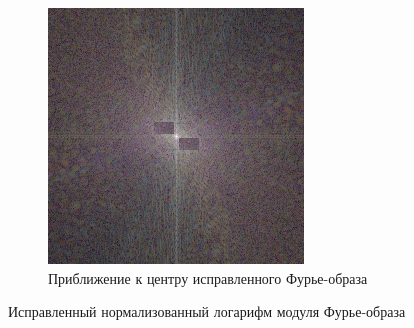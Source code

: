 \documentclass[a4paper, 12pt]{article}
\begin{document}
\begin{figure}[H]
\begin{subfigure}{0.45\textwidth}
            \includegraphics[width=\linewidth]{corr_fft2_close.png}
            \caption{Приближение к центру исправленного Фурье-образа}
            \label{fig:c4fft2cl}
        \end{subfigure}
        \caption{Исправленный нормализованный логарифм модуля Фурье-образа}
        \label{fig:cfft2s}
    \end{figure}
\end{document}
